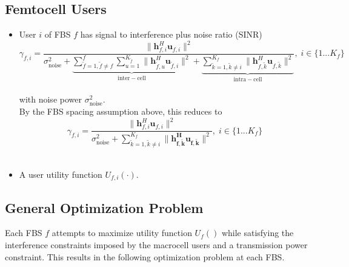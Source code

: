 \documentclass[12pt,a4paper]{report}
\begin{document}
\subsection{Femtocell Users}
\begin{itemize}

\item User $i$ of FBS $f$ has signal to interference plus noise ratio (SINR)
	\begin{equation*}
	\gamma_{f,i} = \frac{\|\mathbf{h}^H_{f,i}\mathbf{u}_{f,i}\|^2}
	{\sigma^2_{\text{noise}}   +
	\underbrace{
	 \sum_{\tilde{f}=1, \tilde{f}\neq f}^{f} \sum_{u=1}^{K_{\tilde{f}}}
	\|\mathbf{h}^H_{\tilde{f},u}\mathbf{u}_{\tilde{f},i}\|^2}_{\mathrm{inter-cell}}
	 + 
	 \underbrace{
	 \sum_{\tilde{k}=1, \tilde{k}\neq i}^{K_f}
	 \|\mathbf{h}^H_{f,\tilde{k}}\mathbf{u}_{f,\tilde{k}}\|^2}_{\mathrm{intra-cell}}},
	  \; i \in \{1 ... K_f\}
	  \end{equation*}
\\
with noise power $\sigma^2_{\text{noise}}.$
\\

By the FBS spacing assumption above, this reduces to
	\begin{equation*}
	\gamma_{f,i} = \frac{\|\mathbf{h}^H_{f,i}\mathbf{u}_{f,i}\|^2}
	{\sigma^2_{\text{noise}} 
	 + \sum_{\tilde{k}=1, \tilde{k}\neq i}^{K_f}
	  \|\mathbf{h^H_{f,\tilde{k}}u_{f,\tilde{k}}}\|^2},
	  \; i \in \{1 ... K_f\}
	\end{equation*}
\\
\item 
A user utility function $U_{f,i}(\cdot)$. 
\end{itemize}





\subsection{General Optimization Problem}\label{genproblem}

Each FBS $f$ attempts to maximize utility function $U_{f}()$ while satisfying the interference constraints imposed by the macrocell users and a transmission power constraint. This results in the following optimization problem at each FBS.
\par
\end{document}
